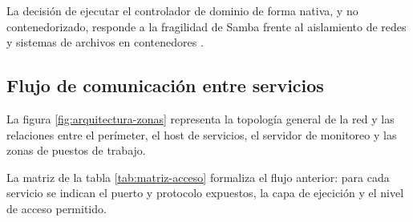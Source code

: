 La decisi\'on de ejecutar el controlador de dominio de forma nativa, y no
contenedorizado, responde a la fragilidad de Samba frente al aislamiento de
redes y sistemas de archivos en contenedores \cite{sambateam2024}.

\subsection{Flujo de comunicaci\'on entre servicios}

La figura \ref{fig:arquitectura-zonas} representa la topolog\'ia general de
la red y las relaciones entre el per\'imeter, el host de servicios, el
servidor de monitoreo y las zonas de puestos de trabajo.


La matriz de la tabla \ref{tab:matriz-acceso} formaliza el flujo anterior:
para cada servicio se indican el puerto y protocolo expuestos, la capa de
ejecici\'on y el nivel de acceso permitido.

